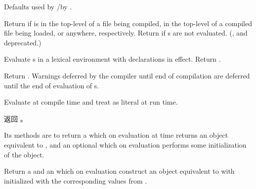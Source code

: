 \begin{LIST}{1cm}
  {
  Defaults used by /by .
  }

  {
  Return  if
   is in the top-level of a file being compiled, in the
  top-level of a compiled file being loaded, or anywhere,
  respectively. Return \retval{\NIL} if s are not
  evaluated. (,  and  deprecated.) 
  }

  {
  Evaluate s in a lexical environment with declarations
   in effect. Return . 
  }

  {
  Return . Warnings deferred by the
  compiler until end of compilation are deferred until the end of
  evaluation of s. 
  }

  {
  Evaluate  at compile time and treat  as
  literal at run time. 
  }

  {
  返回 。
  }

  {
  Its methods are to return a  which on
  evaluation at  time returns an object equivalent to
  , and an optional  which on
  evaluation performs some initialization of the object. 
  }

  {
  Return a  and an  which on evaluation construct an object equivalent to
   with  initialized with the corresponding values
  from . 
  }


\end{LIST}
